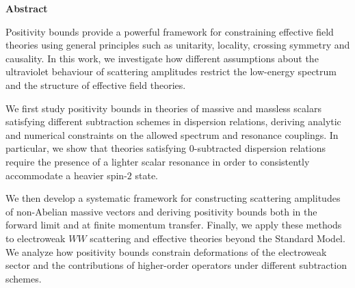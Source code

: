 

\null
\vfill
\vfill
\vfill

\begin{center}
    {\Large\bfseries Abstract}
\end{center}

\vfill

Positivity bounds provide a powerful framework for constraining effective field theories using general principles such as unitarity, locality, crossing symmetry and causality. In this work, we investigate how different assumptions about the ultraviolet behaviour of scattering amplitudes restrict the low-energy spectrum and the structure of effective field theories.

We first study positivity bounds in theories of massive and massless scalars satisfying different subtraction schemes in dispersion relations, deriving analytic and numerical constraints on the allowed spectrum and resonance couplings. In particular, we show that theories satisfying $0$-subtracted dispersion relations require the presence of a lighter scalar resonance in order to consistently accommodate a heavier spin-$2$ state.

We then develop a systematic framework for constructing scattering amplitudes of non-Abelian massive vectors and deriving positivity bounds both in the forward limit and at finite momentum transfer.
Finally, we apply these methods to electroweak $WW$ scattering and effective theories beyond the Standard Model. We analyze how positivity bounds constrain deformations of the electroweak sector and the contributions of higher-order operators under different subtraction schemes.

\vfill
\vfill
\vfill
\null